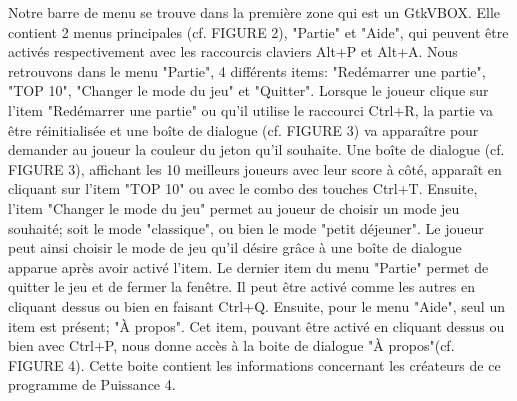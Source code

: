 \documentclass[a4paper, 11pt, oneside]{article}
\begin{document}
Notre barre de menu se trouve dans la première zone qui est un GtkVBOX. Elle contient 2 menus principales (cf. FIGURE 2), "Partie" et "Aide", qui peuvent être activés respectivement avec les raccourcis claviers Alt+P et Alt+A. Nous retrouvons dans le menu "Partie", 4 différents items: "Redémarrer une partie", "TOP 10", "Changer le mode du jeu" et "Quitter". Lorsque le joueur clique sur l'item "Redémarrer une partie" ou qu'il utilise le raccourci Ctrl+R, la partie va être réinitialisée et une boîte de dialogue (cf. FIGURE 3) va apparaître pour demander au joueur la couleur du jeton qu'il souhaite. Une boîte de dialogue (cf. FIGURE 3), affichant les 10 meilleurs joueurs avec leur score à côté, apparaît en cliquant sur l'item "TOP 10" ou avec le combo des touches Ctrl+T. Ensuite, l'item "Changer le mode du jeu" permet au joueur de choisir un mode jeu souhaité; soit le mode "classique", ou bien le mode "petit déjeuner". Le joueur peut ainsi choisir le mode de jeu qu'il désire grâce à une boîte de dialogue apparue après avoir activé l'item. Le dernier item du menu "Partie" permet de quitter le jeu et de fermer la fenêtre. Il peut être activé comme les autres en cliquant dessus ou bien en faisant Ctrl+Q. Ensuite, pour le menu "Aide", seul un item est présent; "À propos". Cet item, pouvant être activé en cliquant dessus ou bien avec Ctrl+P, nous donne accès à la boite de dialogue "À propos"(cf. FIGURE 4). Cette boite contient les informations concernant les créateurs de ce programme de Puissance 4.

\newpage
\end{document}

